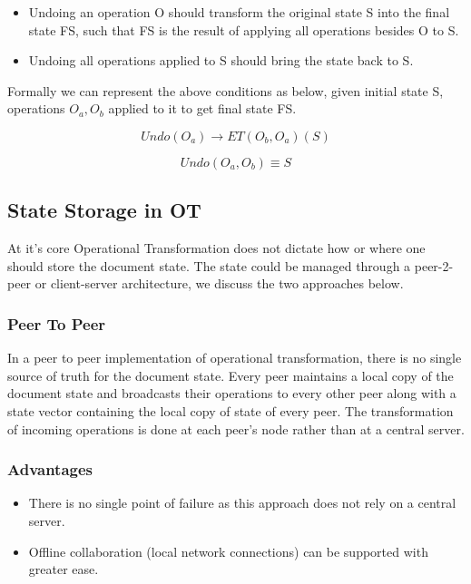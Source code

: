 \documentclass[12pt]{article}
\begin{document}
  \begin{itemize}
    \item Undoing an operation O should transform the original state S into the final state FS, such that FS is the result of applying all operations besides O to S.
    \item Undoing all operations applied to S should bring the state back to S. 
  \end{itemize}
  Formally we can represent the above conditions as below, given initial state S, operations \(O_{a}, O_{b}\)
  applied to it to get final state FS.

  \begin{equation}
    Undo(O_{a}) \rightarrow ET(O_{b}, O_{a})(S)
  \end{equation}

  \begin{equation}
    Undo(O_{a}, O_{b}) \equiv S
  \end{equation}

  \subsection{State Storage in OT}
  At it's core Operational Transformation does not dictate how or where one should store the document state.
  The state could be managed through a peer-2-peer or client-server architecture, we discuss the two approaches below.

  \subsubsection{Peer To Peer}
  In a peer to peer implementation of operational transformation, there is no single source of truth for the document state.
  Every peer maintains a local copy of the document state and broadcasts their operations to every other peer
  along with a state vector containing the local copy of state of every peer.
  The transformation of incoming operations is done at each peer's node rather than at a central server.
  
  \subsubsection*{Advantages}
  \begin{itemize}
    \item There is no single point of failure as this approach does not rely on a central server.
    \item Offline collaboration (local network connections) can be supported with greater ease.
  \end{itemize}
\end{document}
